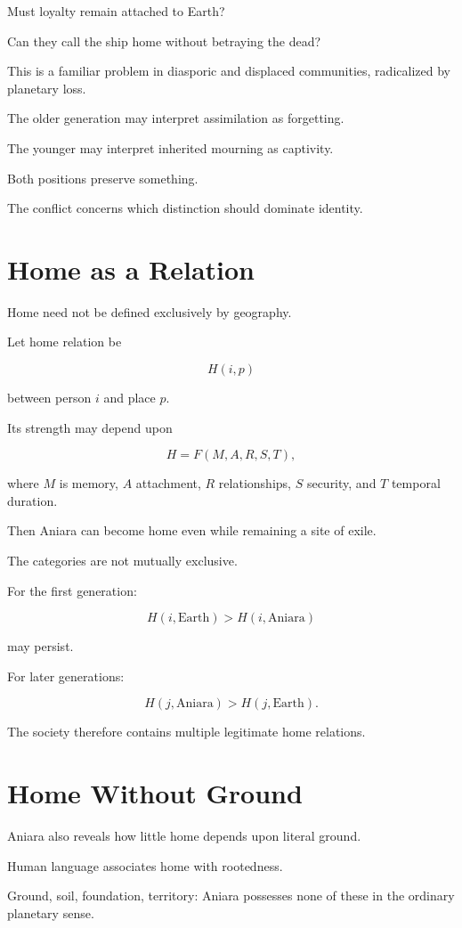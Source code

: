 \documentclass[11pt,oneside]{book}
\theoremstyle{definition}
\theoremstyle{remark}
\begin{document}
Must loyalty remain attached to Earth?

Can they call the ship home without betraying the dead?

This is a familiar problem in diasporic and displaced communities, radicalized by planetary loss.

The older generation may interpret assimilation as forgetting.

The younger may interpret inherited mourning as captivity.

Both positions preserve something.

The conflict concerns which distinction should dominate identity.

\section{Home as a Relation}

Home need not be defined exclusively by geography.

Let home relation be

\[
H(i,p)
\]

between person \(i\) and place \(p\).

Its strength may depend upon

\[
H
=
F(M,A,R,S,T),
\]

where \(M\) is memory, \(A\) attachment, \(R\) relationships, \(S\) security, and \(T\) temporal duration.

Then Aniara can become home even while remaining a site of exile.

The categories are not mutually exclusive.

For the first generation:

\[
H(i,\text{Earth})
>
H(i,\text{Aniara})
\]

may persist.

For later generations:

\[
H(j,\text{Aniara})
>
H(j,\text{Earth}).
\]

The society therefore contains multiple legitimate home relations.

\section{Home Without Ground}

Aniara also reveals how little home depends upon literal ground.

Human language associates home with rootedness.

Ground, soil, foundation, territory: Aniara possesses none of these in the ordinary planetary sense.
\end{document}
